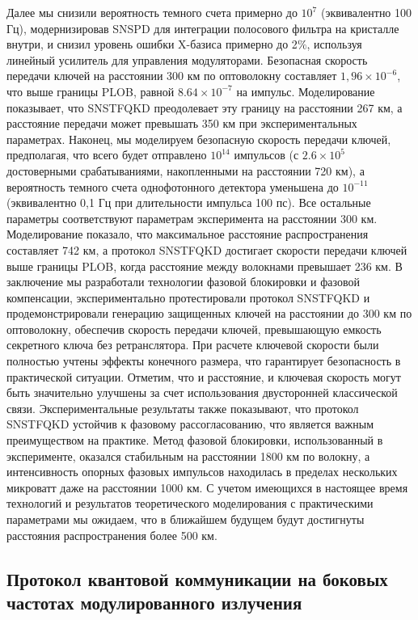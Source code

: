  Далее мы снизили вероятность темного счета примерно до $10^7$ (эквивалентно 100 Гц), модернизировав SNSPD для интеграции полосового фильтра на кристалле внутри, и снизил уровень ошибки X-базиса примерно до 2$\%$, используя линейный усилитель для управления модуляторами. Безопасная скорость передачи ключей на расстоянии 300 км по оптоволокну составляет $1,96 × 10^{-6}$, что выше границы PLOB, равной $8.64 × 10^{-7}$ на импульс. Моделирование показывает, что SNSTFQKD преодолевает эту границу на расстоянии 267 км, а расстояние передачи может превышать 350 км при экспериментальных параметрах. Наконец, мы моделируем безопасную скорость передачи ключей, предполагая, что всего будет отправлено $10^{14}$ импульсов (с $2.6 × 10^5$достоверными срабатываниями, накопленными на расстоянии 720 км), а вероятность темного счета однофотонного детектора уменьшена до $10^{-11}$ (эквивалентно 0,1 Гц при длительности импульса 100 пс). Все остальные параметры соответствуют параметрам эксперимента на расстоянии 300 км. Моделирование показало, что максимальное расстояние распространения составляет 742 км, а протокол SNSTFQKD достигает скорости передачи ключей выше границы PLOB, когда расстояние между волокнами превышает 236 км. В заключение мы разработали технологии фазовой блокировки и фазовой компенсации, экспериментально протестировали протокол SNSTFQKD и продемонстрировали генерацию защищенных ключей на расстоянии до 300 км по оптоволокну, обеспечив скорость передачи ключей, превышающую емкость секретного ключа без ретранслятора. При расчете ключевой скорости были полностью учтены эффекты конечного размера, что гарантирует безопасность в практической ситуации. Отметим, что и расстояние, и ключевая скорость могут быть значительно улучшены за счет использования двусторонней классической связи. Экспериментальные результаты также показывают, что протокол SNSTFQKD устойчив к фазовому рассогласованию, что является важным преимуществом на практике. Метод фазовой блокировки, использованный в эксперименте, оказался стабильным на расстоянии 1800 км по волокну, а интенсивность опорных фазовых импульсов находилась в пределах нескольких микроватт даже на расстоянии 1000 км. С учетом имеющихся в настоящее время технологий и результатов теоретического моделирования с практическими параметрами мы ожидаем, что в ближайшем будущем будут достигнуты расстояния распространения более 500 км.


\subsection{Протокол квантовой коммуникации на боковых частотах модулированного излучения}\label{sec:ch1/sect2/subsec2}

